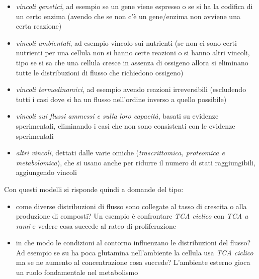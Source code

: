 \documentclass[a4paper,12pt, oneside]{book}
\begin{document}
\begin{itemize}
  \item \textit{vincoli genetici}, ad esempio se un gene viene espresso o se si
  ha la codifica di un certo enzima (avendo che se non c'è un gene/enzima non
  avviene una certa reazione)
  \item \textit{vincoli ambientali}, ad esempio vincolo sui nutrienti (se non ci
  sono certi nutrienti per una cellula non si hanno certe reazioni o si hanno
  altri vincoli, tipo se si sa che una cellula cresce in assenza di ossigeno
  allora si eliminano tutte le distribuzioni di flusso che richiedono ossigeno)
  \item \textit{vincoli termodinamici}, ad esempio avendo reazioni irreversibili
  (escludendo tutti i casi dove si ha un flusso nell'ordine inverso a quello
  possibile) 
  \item \textit{vincoli sui flussi ammessi e sulla loro capacità}, basati su
  evidenze sperimentali, eliminando i casi che non sono consistenti con le
  evidenze sperimentali
  \item \textit{altri vincoli}, dettati dalle varie omiche
  (\textit{trascrittomica, proteomica e metabolomica}), che si usano anche per
  ridurre il numero di stati raggiungibili, aggiungendo vincoli
\end{itemize}
Con questi modelli si risponde quindi a domande del tipo:
\begin{itemize}
  \item come diverse distribuzioni di flusso sono collegate al tasso di crescita
  o alla produzione di composti? Un esempio è confrontare \textit{TCA ciclico}
  con \textit{TCA a rami} e vedere cosa succede al rateo di proliferazione 
  \item in che modo le condizioni al contorno influenzano le distribuzioni del
  flusso? Ad esempio se su ha poca glutamina nell'ambiente la cellula usa
  \textit{TCA ciclico} ma se ne aumento al concentrazione cosa succede?
  L'ambiente esterno gioca un ruolo fondamentale nel metabolismo
\end{itemize}
\end{document}

